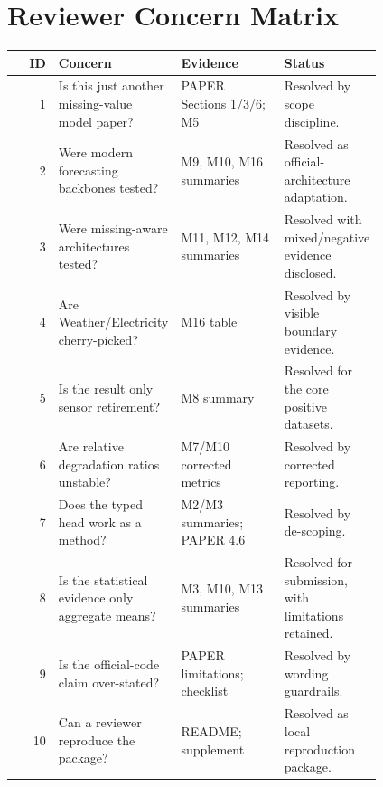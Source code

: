 \documentclass[10pt]{article}
\begin{document}
\section{Reviewer Concern Matrix}
\small
\begin{longtable}{rp{0.33\linewidth}p{0.28\linewidth}p{0.2\linewidth}}
\toprule
ID & Concern & Evidence & Status\\
\midrule
1 & Is this just another missing-value model paper? & PAPER Sections 1/3/6; M5 & Resolved by scope discipline.\\
2 & Were modern forecasting backbones tested? & M9, M10, M16 summaries & Resolved as official-architecture adaptation.\\
3 & Were missing-aware architectures tested? & M11, M12, M14 summaries & Resolved with mixed/negative evidence disclosed.\\
4 & Are Weather/Electricity cherry-picked? & M16 table & Resolved by visible boundary evidence.\\
5 & Is the result only sensor retirement? & M8 summary & Resolved for the core positive datasets.\\
6 & Are relative degradation ratios unstable? & M7/M10 corrected metrics & Resolved by corrected reporting.\\
7 & Does the typed head work as a method? & M2/M3 summaries; PAPER 4.6 & Resolved by de-scoping.\\
8 & Is the statistical evidence only aggregate means? & M3, M10, M13 summaries & Resolved for submission, with limitations retained.\\
9 & Is the official-code claim over-stated? & PAPER limitations; checklist & Resolved by wording guardrails.\\
10 & Can a reviewer reproduce the package? & README; supplement & Resolved as local reproduction package.\\
\bottomrule
\end{longtable}
\normalsize
\end{document}
